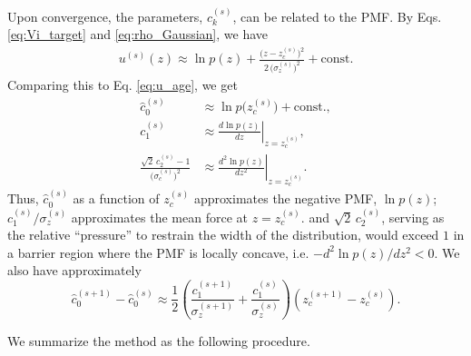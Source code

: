\documentclass[reprint, superscriptaddress, floatfix]{revtex4-1}
\begin{document}
Upon convergence,
the parameters, $c_k^{(s)}$,
can be related to the PMF.
By Eqs. \eqref{eq:Vi_target} and \eqref{eq:rho_Gaussian}, we have
\begin{align*}
  u^{(s)}(z)
  \approx
  \ln p(z)
  +
  \frac{ \bigl(z - z_c^{(s)} \bigr)^2 }
  { 2 \, \bigl( \sigma_z^{(s)} \bigr)^2 }
  +
  \mathrm{const.}
\end{align*}
%
Comparing this to Eq. \eqref{eq:u_age}, we get
\begin{align}
  \hat c_0^{(s)}
  &\approx \ln p\bigl(z_c^{(s)}\bigr) + \mathrm{const.}
  ,
  \label{eq:c0hat_limit} \\
  c_1^{(s)}
  &\approx \left. \frac{d \ln p(z) } { d z } \right|_{z = z_c^{(s)}}
  ,
  \label{eq:c1_limit} \\
  \frac{
    \sqrt 2 \, c_2^{(s)} - 1
  } { \bigl( \sigma_c^{(s)} \bigr)^2 }
  &\approx \left. \frac{d^2 \ln p(z) } { d z^2 } \right|_{z = z_c^{(s)}}
  .
  \label{eq:c2_limit}
\end{align}
%
Thus,
$\hat c_0^{(s)}$ as a function of $z_c^{(s)}$
approximates the negative PMF, $\ln p(z)$;\cite{maragliano2006, *abrams2008}
$c_1^{(s)}/\sigma_z^{(s)}$
approximates the mean force at $z = z_c^{(s)}$.
%
and $\sqrt{2} \, c_2^{(s)}$,
serving as the relative ``pressure''
to restrain the width of the distribution,
would exceed $1$ in a barrier region
where the PMF is locally concave,
i.e. $-d^2\ln p(z)/dz^2 < 0$.
%
%
We also have approximately\cite{park2007, *nguyen2013, *zhang2015st}
\begin{equation}
  \hat c_0^{(s+1)} - \hat c_0^{(s)}
  \approx
  \frac{1}{2}\left(
    \frac{ c_1^{(s+1)} } { \sigma_z^{(s+1)} }
    +
    \frac{ c_1^{(s)} } { \sigma_z^{(s)} }
  \right)
  \left(
  z_c^{(s+1)} - z_c^{(s)}
  \right)
  .
  \label{eq:c0_est}
\end{equation}
%
%


We summarize the method as the following procedure.
\end{document}
